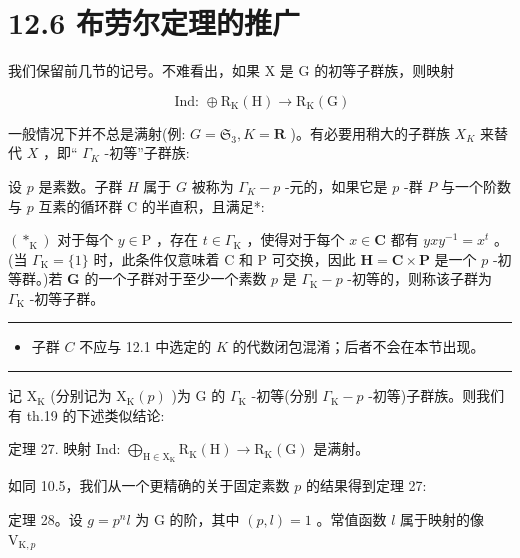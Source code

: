 \documentclass[10pt]{article}
\newcommand{\HRule}{\begin{center}\rule{0.9\linewidth}{0.2mm}\end{center}}
\begin{document}
\section*{12.6 布劳尔定理的推广}

我们保留前几节的记号。不难看出，如果 \(\mathrm{X}\) 是 \(\mathrm{G}\) 的初等子群族，则映射

\[
\text{ Ind: } \oplus  {\mathrm{R}}_{\mathrm{K}}\left( \mathrm{H}\right)  \rightarrow  {\mathrm{R}}_{\mathrm{K}}\left( \mathrm{G}\right)
\]

一般情况下并不总是满射(例: \(G = {\mathfrak{S}}_{3},K = \mathbf{R}\) )。有必要用稍大的子群族 \({X}_{K}\) 来替代 \(X\) ，即“ \({\Gamma }_{K}\) -初等”子群族:

设 \(p\) 是素数。子群 \(H\) 属于 \(G\) 被称为 \({\Gamma }_{K} - p\) -元的，如果它是 \(p\) -群 \(P\) 与一个阶数与 \(p\) 互素的循环群 C 的半直积，且满足*:

\(\left( { * }_{\mathrm{K}}\right)\) 对于每个 \(y \in  \mathrm{P}\) ，存在 \(t \in  {\Gamma }_{\mathrm{K}}\) ，使得对于每个 \(x \in  \mathbf{C}\) 都有 \({yx}{y}^{-1} = {x}^{t}\) 。(当 \({\Gamma }_{\mathrm{K}} = \{ 1\}\) 时，此条件仅意味着 \(\mathrm{C}\) 和 \(\mathrm{P}\) 可交换，因此 \(\mathbf{H} = \mathbf{C} \times  \mathbf{P}\) 是一个 \(p\) -初等群。)若 \(\mathbf{G}\) 的一个子群对于至少一个素数 \(p\) 是 \({\Gamma }_{\mathrm{K}} - p\) -初等的，则称该子群为 \({\Gamma }_{\mathrm{K}}\) -初等子群。

\HRule

\begin{itemize}\relax
\item\relax 子群 \(C\) 不应与 12.1 中选定的 \(K\) 的代数闭包混淆；后者不会在本节出现。
\end{itemize}

\HRule

记 \({\mathrm{X}}_{\mathrm{K}}\) (分别记为 \({\mathrm{X}}_{\mathrm{K}}\left( p\right)\) )为 G 的 \({\Gamma }_{\mathrm{K}}\) -初等(分别 \({\Gamma }_{\mathrm{K}} - p\) -初等)子群族。则我们有 th.19 的下述类似结论:

定理 27. 映射 Ind: \({\bigoplus }_{\mathrm{H} \in  {\mathrm{X}}_{\mathrm{K}}}{\mathrm{R}}_{\mathrm{K}}\left( \mathrm{H}\right)  \rightarrow  {\mathrm{R}}_{\mathrm{K}}\left( \mathrm{G}\right)\) 是满射。

如同 10.5，我们从一个更精确的关于固定素数 \(p\) 的结果得到定理 27:

定理 28。设 \(g = {p}^{n}l\) 为 \(\mathrm{G}\) 的阶，其中 \(\left( {p,l}\right)  = 1\) 。常值函数 \(l\) 属于映射的像 \({\mathrm{V}}_{\mathrm{K},p}\)
\end{document}
